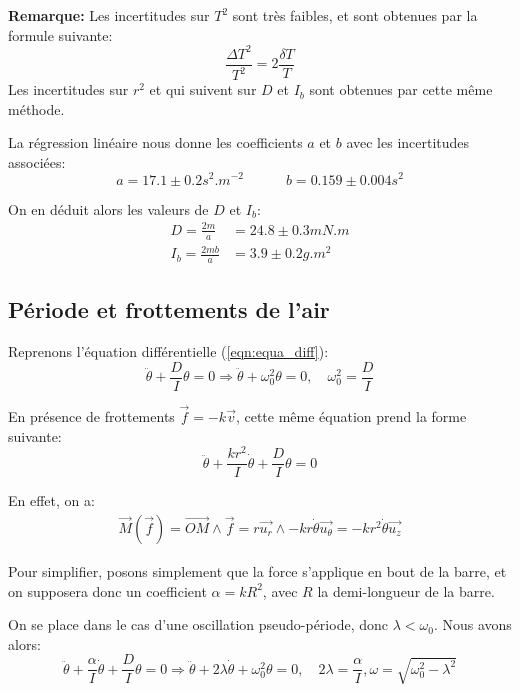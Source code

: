 \documentclass[12pt]{article}
\newcommand{\ut}{\vec{u_\theta}}
\newcommand{\ur}{\vec{u_r}}
\newcommand{\uz}{\vec{u_z}}
\begin{document}
\textbf{Remarque:} Les incertitudes sur $T^2$ sont très faibles, et sont obtenues par la formule suivante:
\begin{equation}
    \frac{\Delta T^2}{T^2} = 2 \frac{\delta T}{T}
\end{equation}
Les incertitudes sur $r^2$ et qui suivent sur $D$ et $I_b$ sont obtenues par cette même méthode.

La régression linéaire nous donne les coefficients $a$ et $b$ avec les incertitudes associées:
\begin{equation}
    a = 17.1 \pm 0.2 s^2.m^{-2} \quad \quad \quad b = 0.159 \pm 0.004 s^2
\end{equation}

On en déduit alors les valeurs de $D$ et $I_b$:
\begin{align*}
    D = \frac{2m}{a} & = 24.8 \pm 0.3 mN.m \\
    I_b = \frac{2mb}{a} & = 3.9 \pm 0.2 g.m^2
\end{align*}


\break
\subsection{Période et frottements de l'air}
\label{section:periode}
Reprenons l'équation différentielle (\ref{eqn:equa_diff}):
\begin{equation}
    \ddot \theta + \frac{D}{I}\theta = 0 \Rightarrow \ddot \theta + \omega_0^2 \theta = 0, \quad \omega_0^2 = \frac{D}{I}
    \label{eqn:sans_frottements}
\end{equation}


En présence de frottements $\vec{f} = -k \vec{v}$, cette même équation prend la forme suivante:
\begin{equation}
    \ddot \theta + \frac{k r^2}{I} \dot \theta + \frac{D}{I}\theta = 0
\end{equation}

En effet, on a:
\begin{align}
    \vec{M}(\vec{f}) = \vec{OM} \wedge \vec{f} = r\ur \wedge -k r \dot \theta \ut = -k r^2 \dot \theta \uz
\end{align}

Pour simplifier, posons simplement que la force s'applique en bout de la barre, et on supposera donc un coefficient 
$\alpha = k R^2$, avec $R$ la demi-longueur de la barre.

On se place dans le cas d'une oscillation pseudo-période, donc $\lambda < \omega_0$. Nous avons alors:
\begin{equation}
    \ddot \theta + \frac{\alpha}{I} \dot \theta + \frac{D}{I}\theta = 0 \Rightarrow \ddot \theta + 2\lambda \dot \theta + \omega_0^2\theta = 0, \quad 2\lambda = \frac{\alpha}{I}, \omega = \sqrt{\omega_0^2 - \lambda^2} 
    \label{eqn:avec_frottements}
\end{equation}
\end{document}
